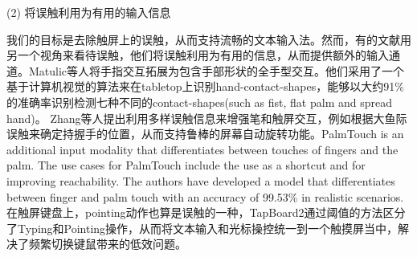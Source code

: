 

(2) 将误触利用为有用的输入信息

我们的目标是去除触屏上的误触，从而支持流畅的文本输入法。然而，有的文献用另一个视角来看待误触，他们将误触利用为有用的信息，从而提供额外的输入通道。Matulic等人\cite{2017-HandContact}将手指交互拓展为包含手部形状的全手型交互。他们采用了一个基于计算机视觉的算法来在tabletop上识别hand-contact-shapes，能够以大约91\%的准确率识别检测七种不同的contact-shapes(such as fist, flat palm and spread hand)。 Zhang等人\cite{2019-PenTouch}提出利用多样误触信息来增强笔和触屏交互，例如根据大鱼际误触来确定持握手的位置，从而支持鲁棒的屏幕自动旋转功能。PalmTouch is \cite{2018-PalmTouch} an additional input modality that differentiates between touches of fingers and the palm. The use cases for PalmTouch include the use as a shortcut and for improving reachability. The authors have developed a model that differentiates between finger and palm touch with an accuracy of 99.53\% in realistic scenarios. 在触屏键盘上，pointing动作也算是误触的一种，TapBoard2\cite{2016-TapBoard2}通过阈值的方法区分了Typing和Pointing操作，从而将文本输入和光标操控统一到一个触摸屏当中，解决了频繁切换键鼠带来的低效问题\cite{2006-TouchType}。
